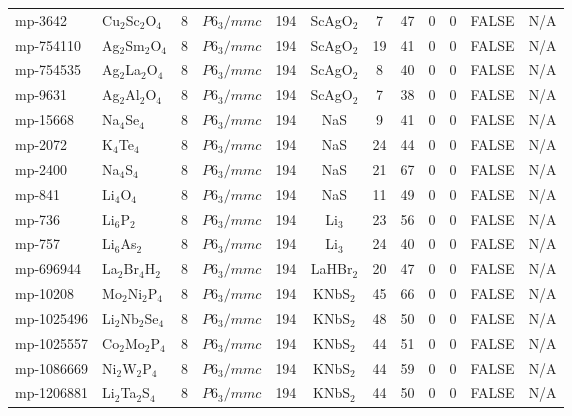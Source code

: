 {\begin{longtable}{llcccccccccc}
    mp-3642 & Cu$_{2}$Sc$_{2}$O$_{4}$ & 8     & $P6_3/mmc$ & 194   & ScAgO$_{2}$ & 7     & 47    & 0     & 0     & FALSE & N/A \\
    mp-754110 & Ag$_{2}$Sm$_{2}$O$_{4}$ & 8     & $P6_3/mmc$ & 194   & ScAgO$_{2}$ & 19    & 41    & 0     & 0     & FALSE & N/A \\
    mp-754535 & Ag$_{2}$La$_{2}$O$_{4}$ & 8     & $P6_3/mmc$ & 194   & ScAgO$_{2}$ & 8     & 40    & 0     & 0     & FALSE & N/A \\
    mp-9631 & Ag$_{2}$Al$_{2}$O$_{4}$ & 8     & $P6_3/mmc$ & 194   & ScAgO$_{2}$ & 7     & 38    & 0     & 0     & FALSE & N/A \\
    mp-15668 & Na$_{4}$Se$_{4}$ & 8     & $P6_3/mmc$ & 194   & NaS   & 9     & 41    & 0     & 0     & FALSE & N/A \\
    mp-2072 & K$_{4}$Te$_{4}$ & 8     & $P6_3/mmc$ & 194   & NaS   & 24    & 44    & 0     & 0     & FALSE & N/A \\
    mp-2400 & Na$_{4}$S$_{4}$ & 8     & $P6_3/mmc$ & 194   & NaS   & 21    & 67    & 0     & 0     & FALSE & N/A \\
    mp-841 & Li$_{4}$O$_{4}$ & 8     & $P6_3/mmc$ & 194   & NaS   & 11    & 49    & 0     & 0     & FALSE & N/A \\
    mp-736 & Li$_{6}$P$_{2}$ & 8     & $P6_3/mmc$ & 194   & Li$_{3}$ & 23    & 56    & 0     & 0     & FALSE & N/A \\
    mp-757 & Li$_{6}$As$_{2}$ & 8     & $P6_3/mmc$ & 194   & Li$_{3}$ & 24    & 40    & 0     & 0     & FALSE & N/A \\
    mp-696944 & La$_{2}$Br$_{4}$H$_{2}$ & 8     & $P6_3/mmc$ & 194   & LaHBr$_{2}$ & 20    & 47    & 0     & 0     & FALSE & N/A \\
    mp-10208 & Mo$_{2}$Ni$_{2}$P$_{4}$ & 8     & $P6_3/mmc$ & 194   & KNbS$_{2}$ & 45    & 66    & 0     & 0     & FALSE & N/A \\
    mp-1025496 & Li$_{2}$Nb$_{2}$Se$_{4}$ & 8     & $P6_3/mmc$ & 194   & KNbS$_{2}$ & 48    & 50    & 0     & 0     & FALSE & N/A \\
    mp-1025557 & Co$_{2}$Mo$_{2}$P$_{4}$ & 8     & $P6_3/mmc$ & 194   & KNbS$_{2}$ & 44    & 51    & 0     & 0     & FALSE & N/A \\
    mp-1086669 & Ni$_{2}$W$_{2}$P$_{4}$ & 8     & $P6_3/mmc$ & 194   & KNbS$_{2}$ & 44    & 59    & 0     & 0     & FALSE & N/A \\
    mp-1206881 & Li$_{2}$Ta$_{2}$S$_{4}$ & 8     & $P6_3/mmc$ & 194   & KNbS$_{2}$ & 44    & 50    & 0     & 0     & FALSE & N/A \\

\end{longtable}}
